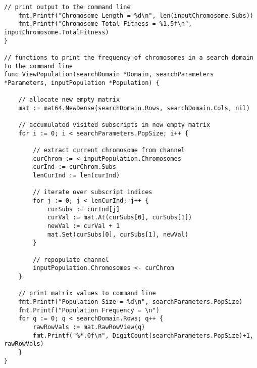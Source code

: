 \begin{lstlisting}[basicstyle=\tiny]
	// print output to the command line
	fmt.Printf("Chromosome Length = %d\n", len(inputChromosome.Subs))
	fmt.Printf("Chromosome Total Fitness = %1.5f\n", inputChromosome.TotalFitness)
}

// functions to print the frequency of chromosomes in a search domain to the command line
func ViewPopulation(searchDomain *Domain, searchParameters *Parameters, inputPopulation *Population) {

	// allocate new empty matrix
	mat := mat64.NewDense(searchDomain.Rows, searchDomain.Cols, nil)

	// accumulated visited subscripts in new empty matrix
	for i := 0; i < searchParameters.PopSize; i++ {

		// extract current chromosome from channel
		curChrom := <-inputPopulation.Chromosomes
		curInd := curChrom.Subs
		lenCurInd := len(curInd)

		// iterate over subscript indices
		for j := 0; j < lenCurInd; j++ {
			curSubs := curInd[j]
			curVal := mat.At(curSubs[0], curSubs[1])
			newVal := curVal + 1
			mat.Set(curSubs[0], curSubs[1], newVal)
		}

		// repopulate channel
		inputPopulation.Chromosomes <- curChrom
	}

	// print matrix values to command line
	fmt.Printf("Population Size = %d\n", searchParameters.PopSize)
	fmt.Printf("Population Frequency = \n")
	for q := 0; q < searchDomain.Rows; q++ {
		rawRowVals := mat.RawRowView(q)
		fmt.Printf("%*.0f\n", DigitCount(searchParameters.PopSize)+1, rawRowVals)
	}
}

\end{lstlisting}


